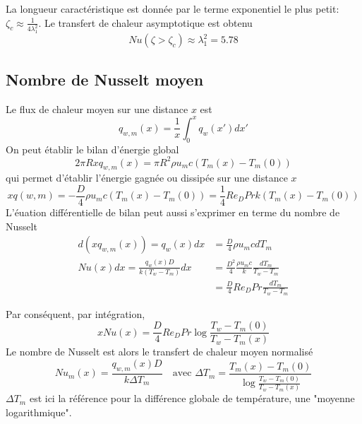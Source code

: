 \documentclass[a4paper,11pt]{report}
\newcommand{\recip}[1]{\frac{1}{#1}}
\begin{document}
      La longueur caractéristique est donnée par le terme exponentiel le plus petit: $\zeta_c \approx \recip{4 \lambda_1^2}$. Le transfert de chaleur asymptotique est obtenu
      \begin{equation}
        Nu(\zeta > \zeta_c) \approx \lambda_1^2 = 5.78
      \end{equation}

    \subsection{Nombre de Nusselt moyen}
      Le flux de chaleur moyen sur une distance $x$ est
      \begin{equation}
        q_{w,m} (x) = \recip{x} \int_0^x q_w(x') dx'
      \end{equation}
      On peut établir le bilan d'énergie global
      \begin{equation}
        2\pi R x q_{w, m}(x) = \pi R^2 \rho u_m c (T_m(x) - T_m(0))
      \end{equation}
      qui permet d'établir l'énergie gagnée ou dissipée sur une distance $x$
      \begin{equation}
          x q(w, m) = - \frac{D}{4} \rho u_m c (T_m(x) - T_m(0)) = \recip{4}Re_D Pr k (T_m(x) - T_m(0))
      \end{equation}
      L'éuation différentielle de bilan peut aussi s'exprimer en terme du nombre de Nusselt
      \begin{equation}
        \begin{aligned}
          d(x q_{w,m}(x)) = q_w(x) dx &= \frac{D}{4} \rho u_m c dT_m\\
          Nu(x)dx = \frac{q_w(x) D}{k (T_w - T_m)} dx &= \frac{D^2}{4} \frac{\rho u_m c}{k} \frac{dT_m}{T_w - T_m}\\
          &= \frac{D}{4} Re_D Pr \frac{dT_m}{T_w - T_m}
        \end{aligned}
      \end{equation}

      Par conséquent, par intégration,
      \begin{equation}
        x Nu(x) = \frac{D}{4} Re_D Pr \log\frac{T_w - T_m(0)}{T_w - T_m(x)}
      \end{equation}
      Le nombre de Nusselt est alors le transfert de chaleur moyen normalisé
      \begin{equation}
        Nu_m(x) = \frac{q_{w,m}(x) D}{k \Delta T_m} \quad \textrm{avec } \Delta T_m = \frac{T_m(x) - T_m(0)}{\log \frac{T_w - T_m(0)}{T_w - T_m(x)}}
      \end{equation}
      $\Delta T_m$ est ici la référence pour la différence globale de température, une "moyenne logarithmique".




\begin{appendix}
  
\end{appendix}
\end{document}
